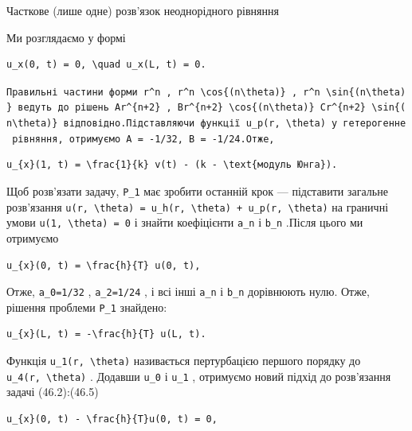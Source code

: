 \documentclass[
  ukrainian,
]{article}
\begin{document}
Часткове (лише одне) розв'язок неоднорідного рівняння

Ми розглядаємо у формі

\begin{verbatim}
u_x(0, t) = 0, \quad u_x(L, t) = 0.
\end{verbatim}

\texttt{Правильні\ частини\ форми\ \textquotesingle{}r\^{}n\textquotesingle{}\ ,\ \textquotesingle{}r\^{}n\ \textbackslash{}cos\{(n\textbackslash{}theta)\}\textquotesingle{}\ ,\ \textquotesingle{}r\^{}n\ \textbackslash{}sin\{(n\textbackslash{}theta)\}\textquotesingle{}\ ведуть\ до\ рішень\ \textquotesingle{}Ar\^{}\{n+2\}\textquotesingle{}\ ,\ \textquotesingle{}Br\^{}\{n+2\}\ \textbackslash{}cos\{(n\textbackslash{}theta)\}\textquotesingle{}\ \textquotesingle{}Cr\^{}\{n+2\}\ \textbackslash{}sin\{(n\textbackslash{}theta)\}\textquotesingle{}\ відповідно.Підставляючи\ функції\ \textquotesingle{}u\_p(r,\ \textbackslash{}theta)\textquotesingle{}\ у\ гетерогенне\ рівняння,\ отримуємо\ A\ =\ -1/32,\ B\ =\ -1/24.Отже,}

\begin{verbatim}
u_{x}(1, t) = \frac{1}{k} v(t) - (k - \text{модуль Юнга}).
\end{verbatim}

Щоб розв'язати задачу, \texttt{P\_1} має зробити останній крок ---
підставити загальне розв'язання
\texttt{u(r,\ \textbackslash{}theta)\ =\ u\_h(r,\ \textbackslash{}theta)\ +\ u\_p(r,\ \textbackslash{}theta)}
на граничні умови \texttt{u(1,\ \textbackslash{}theta)\ =\ 0} і знайти
коефіцієнти \texttt{a\_n} і \texttt{b\_n} .Після цього ми отримуємо

\begin{verbatim}
u_{x}(0, t) = \frac{h}{T} u(0, t),
\end{verbatim}

Отже, \texttt{a\_0=1/32} , \texttt{a\_2=1/24} , і всі інші \texttt{a\_n}
і \texttt{b\_n} дорівнюють нулю. Отже, рішення проблеми \texttt{P\_1}
знайдено:

\begin{verbatim}
u_{x}(L, t) = -\frac{h}{T} u(L, t).
\end{verbatim}

Функція \texttt{u\_1(r,\ \textbackslash{}theta)} називається
пертурбацією першого порядку до \texttt{u\_4(r,\ \textbackslash{}theta)}
. Додавши \texttt{u\_0} і \texttt{u\_1} , отримуємо новий підхід до
розв'язання задачі (46.2):(46.5)

\begin{verbatim}
u_{x}(0, t) - \frac{h}{T}u(0, t) = 0,
\end{verbatim}
\end{document}
